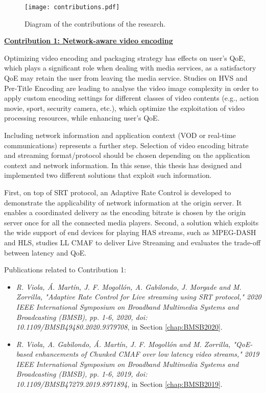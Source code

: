 \begin{figure}[htp]
	\centering
	\texttt{[image: contributions.pdf]}
	\caption{Diagram of the contributions of the research.}
	\label{fig:contributions}
\end{figure}

\textbf{\underline{Contribution 1: Network-aware video encoding}}
\label{contribution:1}

Optimizing video encoding and packaging strategy has effects on user's QoE, which plays a significant role when dealing with media services, as a satisfactory QoE may retain the user from leaving the media service. Studies on HVS \cite{torres2012video} and Per-Title Encoding \cite{PerTitle2015} are leading to analyse the video image complexity in order to apply custom encoding settings for different classes of video contents (e.g., action movie, sport, security camera, etc.), which optimize the exploitation of video processing resources, while enhancing user's QoE.

Including network information and application context (VOD or real-time communications) represents a further step. Selection of video encoding bitrate and streaming format/protocol should be chosen depending on the application context and network information. In this sense, this thesis has designed and implemented two different solutions that exploit such information.

First, on top of SRT protocol, an Adaptive Rate Control is developed to demonstrate the applicability of network information at the origin server. It enables a coordinated delivery as the encoding bitrate is chosen by the origin server once for all the connected media players. Second, a solution which exploits the wide support of end devices for playing HAS streams, such as MPEG-DASH and HLS, studies LL CMAF to deliver Live Streaming and evaluates the trade-off between latency and QoE.

Publications related to Contribution 1:
\begin{itemize}
	\item \textit{R. Viola, \'A. Mart\'in, J. F. Mogoll\'on, A. Gabilondo, J. Morgade and M. Zorrilla, "Adaptive Rate Control for Live streaming using SRT protocol," 2020 IEEE International Symposium on Broadband Multimedia Systems and Broadcasting (BMSB), pp. 1-6, 2020, doi: 10.1109/BMSB49480.2020.9379708}, in Section \ref{chap:BMSB2020}.
	\item \textit{R. Viola, A. Gabilondo, \'A. Mart\'in, J. F. Mogoll\'on and M. Zorrilla, "QoE-based enhancements of Chunked CMAF over low latency video streams," 2019 IEEE International Symposium on Broadband Multimedia Systems and Broadcasting (BMSB), pp. 1-6, 2019, doi: 10.1109/BMSB47279.2019.8971894}, in Section \ref{chap:BMSB2019}.
\end{itemize}

